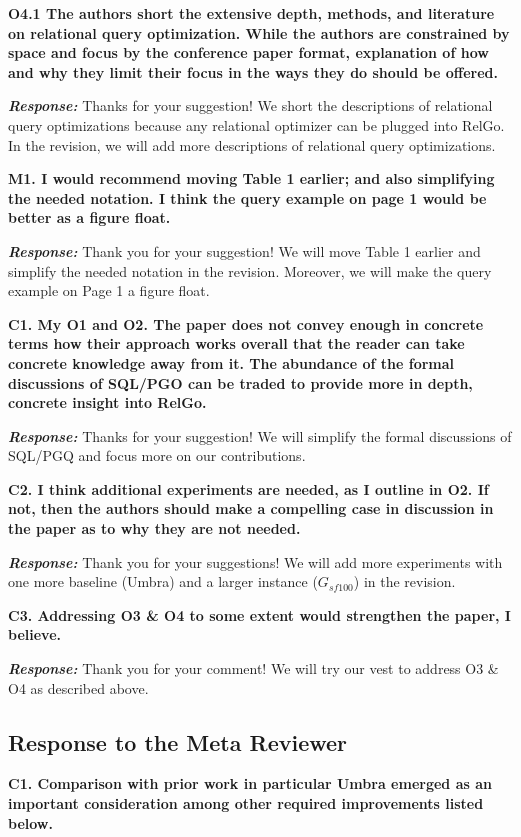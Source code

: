 \textbf{O4.1 The authors short the extensive depth, methods, and literature on relational query optimization. While the authors are constrained by space and focus by the conference paper format, explanation of how and why they limit their focus in the ways they do should be offered. }

\textbf{\textit{Response: }}
Thanks for your suggestion! 
We short the descriptions of relational query optimizations because any relational optimizer can be plugged into RelGo.
In the revision, we will add more descriptions of relational query optimizations.


\textbf{M1. I would recommend moving Table 1 earlier; and also simplifying the needed notation. I think the query example on page 1 would be better as a figure float. }

\textbf{\textit{Response: }}
Thank you for your suggestion! We will move Table 1 earlier and simplify the needed notation in the revision. Moreover, we will make the query example on Page 1 a figure float.

\textbf{
C1. My O1 and O2. The paper does not convey enough in concrete terms how their approach works overall that the reader can take concrete knowledge away from it. The abundance of the formal discussions of SQL/PGO can be traded to provide more in depth, concrete insight into RelGo.}

\textbf{\textit{Response: }}
Thanks for your suggestion! We will simplify the formal discussions of SQL/PGQ and focus more on our contributions.


\textbf{
C2. I think additional experiments are needed, as I outline in O2. If not, then the authors should make a compelling case in discussion in the paper as to why they are not needed.}

\textbf{\textit{Response: }}
Thank you for your suggestions! We will add more experiments with one more baseline (Umbra) and a larger instance ($G_{sf100}$) in the revision.


\textbf{
C3. Addressing O3 \& O4 to some extent would strengthen the paper, I believe.}

\textbf{\textit{Response: }}
Thank you for your comment! We will try our vest to address O3 \& O4 as described above. 

\subsection{Response to the Meta Reviewer}

\textbf{
C1. Comparison with prior work in particular Umbra emerged as an important consideration among other required improvements listed below.}

